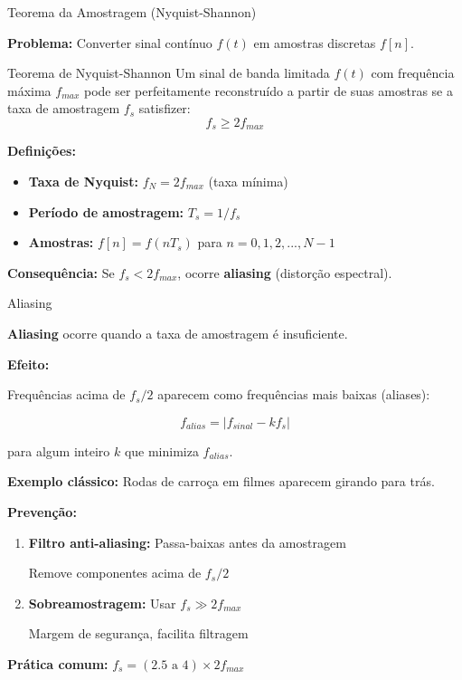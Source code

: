 \begin{frame}{Teorema da Amostragem (Nyquist-Shannon)}

\textbf{Problema:} Converter sinal contínuo $f(t)$ em amostras discretas $f[n]$.

\begin{block}{Teorema de Nyquist-Shannon}
Um sinal de banda limitada $f(t)$ com frequência máxima $f_{max}$ pode ser perfeitamente reconstruído a partir de suas amostras se a taxa de amostragem $f_s$ satisfizer:
\[
f_s \geq 2f_{max}
\]
\end{block}

\textbf{Definições:}

\begin{itemize}
\item \textbf{Taxa de Nyquist:} $f_N = 2f_{max}$ (taxa mínima)
\item \textbf{Período de amostragem:} $T_s = 1/f_s$
\item \textbf{Amostras:} $f[n] = f(nT_s)$ para $n = 0, 1, 2, ..., N-1$
\end{itemize}

\vspace{0.1cm}

\textbf{Consequência:} Se $f_s < 2f_{max}$, ocorre \textbf{aliasing} (distorção espectral).

\end{frame}


\begin{frame}{Aliasing}

\textbf{Aliasing} ocorre quando a taxa de amostragem é insuficiente.

\textbf{Efeito:}

Frequências acima de $f_s/2$ aparecem como frequências mais baixas (aliases):

\[
f_{alias} = |f_{sinal} - kf_s|
\]

para algum inteiro $k$ que minimiza $f_{alias}$.

\vspace{0.1cm}

\textbf{Exemplo clássico:} Rodas de carroça em filmes aparecem girando para trás.

\textbf{Prevenção:}

\begin{enumerate}
\item \textbf{Filtro anti-aliasing:} Passa-baixas antes da amostragem
   
   Remove componentes acima de $f_s/2$

\item \textbf{Sobreamostragem:} Usar $f_s \gg 2f_{max}$
   
   Margem de segurança, facilita filtragem
\end{enumerate}

\textbf{Prática comum:} $f_s = (2.5 \text{ a } 4) \times 2f_{max}$

\end{frame}


